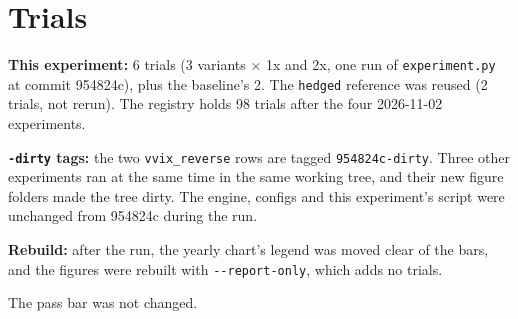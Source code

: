\documentclass{article}
\begin{document}
\section{Trials}

\textbf{This experiment:} 6 trials (3 variants \ensuremath{\times} 1x and 2x, one run of \texttt{experiment.\allowbreak{}py} at commit 954824c), plus the baseline's 2. The \texttt{hedged} reference was reused (2 trials, not rerun). The registry holds 98 trials after the four 2026-11-02 experiments.

\textbf{\texttt{-\allowbreak{}dirty} tags:} the two \texttt{vvix\_\allowbreak{}reverse} rows are tagged \texttt{954824c-\allowbreak{}dirty}. Three other experiments ran at the same time in the same working tree, and their new figure folders made the tree dirty. The engine, configs and this experiment's script were unchanged from 954824c during the run.

\textbf{Rebuild:} after the run, the yearly chart's legend was moved clear of the bars, and the figures were rebuilt with \texttt{-\allowbreak{}-\allowbreak{}report-\allowbreak{}only}, which adds no trials.

The pass bar was not changed.
\end{document}

